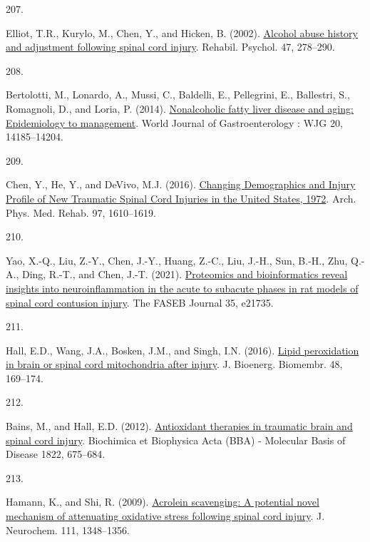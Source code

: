 \documentclass[
]{article}
\newlength{\cslhangindent}
\newlength{\csllabelwidth}
\newlength{\cslentryspacingunit} %
\newenvironment{CSLReferences}[2] %
 {%
  \setlength{\parindent}{0pt}
  \ifodd #1
  \let\oldpar\par
  \def\par{\hangindent=\cslhangindent\oldpar}
  \fi
  \setlength{\parskip}{#2\cslentryspacingunit}
 }%
 {}
\newcommand{\CSLLeftMargin}[1]{\parbox[t]{\csllabelwidth}{#1}}
\newcommand{\CSLRightInline}[1]{\parbox[t]{\linewidth - \csllabelwidth}{#1}\break}
\begin{document}
\begin{CSLReferences}{0}{0}
\leavevmode{}%
\CSLLeftMargin{207. }
\CSLRightInline{Elliot, T.R., Kurylo, M., Chen, Y., and Hicken, B. (2002). \href{https://doi.org/10.1037/0090-5550.47.3.278}{Alcohol abuse history and adjustment following spinal cord injury}. Rehabil. Psychol. 47, 278--290.}

\leavevmode{}%
\CSLLeftMargin{208. }
\CSLRightInline{Bertolotti, M., Lonardo, A., Mussi, C., Baldelli, E., Pellegrini, E., Ballestri, S., Romagnoli, D., and Loria, P. (2014). \href{https://doi.org/10.3748/wjg.v20.i39.14185}{Nonalcoholic fatty liver disease and aging: {Epidemiology} to management}. World Journal of Gastroenterology : WJG 20, 14185--14204.}

\leavevmode{}%
\CSLLeftMargin{209. }
\CSLRightInline{Chen, Y., He, Y., and DeVivo, M.J. (2016). \href{https://doi.org/10.1016/j.apmr.2016.03.017}{Changing {Demographics} and {Injury Profile} of {New Traumatic Spinal Cord Injuries} in the {United States}, 1972\textendash 2014}. Arch. Phys. Med. Rehab. 97, 1610--1619.}

\leavevmode{}%
\CSLLeftMargin{210. }
\CSLRightInline{Yao, X.-Q., Liu, Z.-Y., Chen, J.-Y., Huang, Z.-C., Liu, J.-H., Sun, B.-H., Zhu, Q.-A., Ding, R.-T., and Chen, J.-T. (2021). \href{https://doi.org/10.1096/fj.202100081RR}{Proteomics and bioinformatics reveal insights into neuroinflammation in the acute to subacute phases in rat models of spinal cord contusion injury}. The FASEB Journal 35, e21735.}

\leavevmode{}%
\CSLLeftMargin{211. }
\CSLRightInline{Hall, E.D., Wang, J.A., Bosken, J.M., and Singh, I.N. (2016). \href{https://doi.org/10.1007/s10863-015-9600-5}{Lipid peroxidation in brain or spinal cord mitochondria after injury}. J. Bioenerg. Biomembr. 48, 169--174.}

\leavevmode{}%
\CSLLeftMargin{212. }
\CSLRightInline{Bains, M., and Hall, E.D. (2012). \href{https://doi.org/10.1016/j.bbadis.2011.10.017}{Antioxidant therapies in traumatic brain and spinal cord injury}. Biochimica et Biophysica Acta (BBA) - Molecular Basis of Disease 1822, 675--684.}

\leavevmode{}%
\CSLLeftMargin{213. }
\CSLRightInline{Hamann, K., and Shi, R. (2009). \href{https://doi.org/10.1111/j.1471-4159.2009.06395.x}{Acrolein scavenging: A potential novel mechanism of attenuating oxidative stress following spinal cord injury}. J. Neurochem. 111, 1348--1356.}


\end{CSLReferences}
\end{document}
